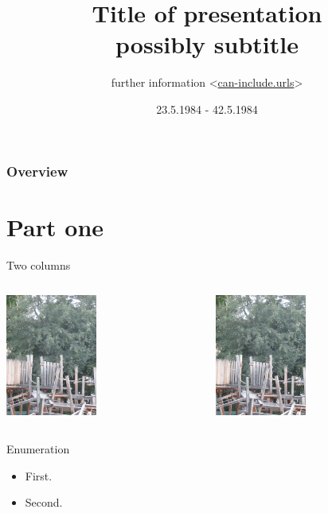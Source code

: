 \documentclass{beamer}
\title[Title of presentation]{Title of presentation\\
{\small possibly subtitle}
}
\author[author name]
{further information <\url{can-include.urls}>}
\institute[Fnord GmbH]{}
\date{23.5.1984 - 42.5.1984}
\begin{document}
{
\begin{frame}
\thispagestyle{empty}
\titlepage
\end{frame}
}

\begin{frame}
\frametitle{Overview}
\tableofcontents
\end{frame}

\setlength\fboxsep{5pt}
\setlength\fboxrule{0pt}

\section{Part one}
  \begin{frame}{Two columns}
    \begin{columns}
    \begin{column}{6cm}
        \includegraphics[height=4cm]{pictures/sample.jpg}
    \end{column}
    \begin{column}{6cm}
        \includegraphics[height=4cm]{pictures/sample.jpg}
    \end{column}
    \end{columns}
  \end{frame}

 \begin{frame}{Enumeration}
    \begin{itemize}
	    \item First.
	    \item Second.
	  \end{itemize}
  \end{frame}
\end{document}
